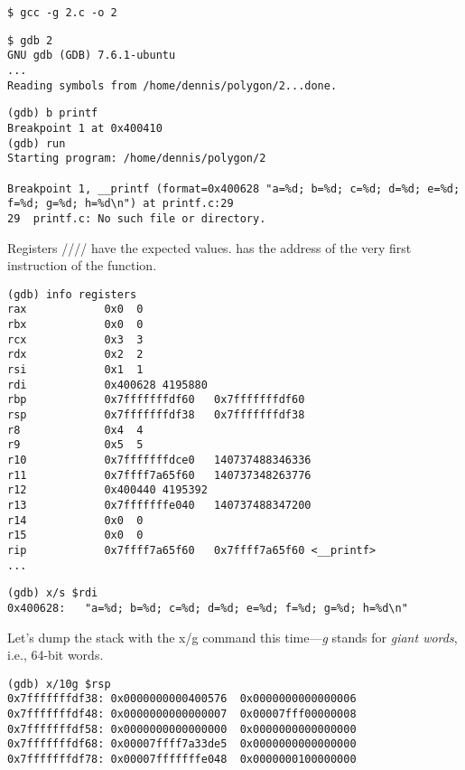 \begin{lstlisting}
$ gcc -g 2.c -o 2
\end{lstlisting}

\begin{lstlisting}
$ gdb 2
GNU gdb (GDB) 7.6.1-ubuntu
...
Reading symbols from /home/dennis/polygon/2...done.
\end{lstlisting}

\begin{lstlisting}[caption=let's set the breakpoint to \printf{,} and run]
(gdb) b printf
Breakpoint 1 at 0x400410
(gdb) run
Starting program: /home/dennis/polygon/2 

Breakpoint 1, __printf (format=0x400628 "a=%d; b=%d; c=%d; d=%d; e=%d; f=%d; g=%d; h=%d\n") at printf.c:29
29	printf.c: No such file or directory.
\end{lstlisting}

Registers \RSI/\RDX/\RCX// have the expected values.
\RIP has the address of the very first instruction of the \printf function.

\begin{lstlisting}
(gdb) info registers
rax            0x0	0
rbx            0x0	0
rcx            0x3	3
rdx            0x2	2
rsi            0x1	1
rdi            0x400628	4195880
rbp            0x7fffffffdf60	0x7fffffffdf60
rsp            0x7fffffffdf38	0x7fffffffdf38
r8             0x4	4
r9             0x5	5
r10            0x7fffffffdce0	140737488346336
r11            0x7ffff7a65f60	140737348263776
r12            0x400440	4195392
r13            0x7fffffffe040	140737488347200
r14            0x0	0
r15            0x0	0
rip            0x7ffff7a65f60	0x7ffff7a65f60 <__printf>
...
\end{lstlisting}

\begin{lstlisting}[caption=let's inspect the format string]
(gdb) x/s $rdi
0x400628:	"a=%d; b=%d; c=%d; d=%d; e=%d; f=%d; g=%d; h=%d\n"
\end{lstlisting}

Let's dump the stack with the x/g command this time---\emph{g} stands for \emph{giant words}, i.e., 64-bit words.

\begin{lstlisting}
(gdb) x/10g $rsp
0x7fffffffdf38:	0x0000000000400576	0x0000000000000006
0x7fffffffdf48:	0x0000000000000007	0x00007fff00000008
0x7fffffffdf58:	0x0000000000000000	0x0000000000000000
0x7fffffffdf68:	0x00007ffff7a33de5	0x0000000000000000
0x7fffffffdf78:	0x00007fffffffe048	0x0000000100000000
\end{lstlisting}

